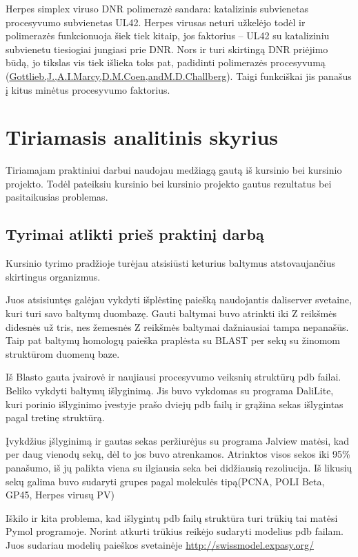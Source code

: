 \documentclass[a4paper,12pt]{article}
\begin{document}
\qquad 
\qquad Herpes simplex viruso DNR polimerazė sandara: katalizinis subvienetas procesyvumo subvienetas UL42. Herpes virusas neturi užkelėjo todėl ir polimerazės funkcionuoja šiek tiek kitaip, jos faktorius – UL42 su kataliziniu subvienetu tiesiogiai jungiasi prie DNR. Nors ir turi skirtingą DNR priėjimo būdą, jo tikslas vis tiek išlieka toks pat, padidinti polimerazės procesyvumą (\hyperlink{Gottlieb}{Gottlieb,J.,A.I.Marcy,D.M.Coen,andM.D.Challberg}). Taigi funkciškai jis panašus į kitus minėtus procesyvumo faktorius.


\clearpage 
\section{Tiriamasis analitinis skyrius}

Tiriamajam praktiniui darbui naudojau medžiagą gautą iš kursinio bei kursinio projekto.
Todėl pateiksiu kursinio bei kursinio projekto gautus rezultatus bei pasitaikusias problemas.


\subsection{Tyrimai atlikti prieš praktinį darbą}
Kursinio tyrimo pradžioje turėjau atsisiūsti keturius baltymus atstovaujančius skirtingus organizmus.

Juos atsisiuntęs galėjau vykdyti išplėstinę paiešką naudojantis daliserver svetaine, kuri turi savo baltymų duombazę. Gauti baltymai buvo atrinkti iki Z reikšmės didesnės už tris, nes žemesnės Z reikšmės baltymai dažniausiai tampa nepanašūs.
Taip pat baltymų homologų paieška praplėsta su BLAST per sekų su žinomom struktūrom duomenų baze.

Iš Blasto gauta įvairovė ir naujiausi procesyvumo veiksnių struktūrų pdb failai. Beliko vykdyti baltymų išlyginimą. Jis buvo vykdomas su programa DaliLite, kuri porinio išlyginimo įvestyje prašo dviejų pdb failų ir grąžina sekas išlygintas pagal tretinę struktūrą.

Įvykdžius įšlyginimą ir gautas sekas peržiurėjus su programa Jalview matėsi, kad per daug vienodų sekų, dėl to jos buvo atrenkamos. Atrinktos visos sekos iki 95\% panašumo, iš jų palikta viena su ilgiausia seka bei didžiausią rezoliucija. Iš likusių sekų galima buvo sudaryti grupes pagal molekulės tipą(PCNA, POLI Beta, GP45, Herpes virusų PV)

Iškilo ir kita problema, kad išlygintų pdb failų struktūra turi trūkių tai matėsi Pymol programoje.
Norint atkurti trūkius reikėjo sudaryti modelius pdb failam. Juos sudariau modelių paieškos svetainėje \hyperlink{swissprot}{http://swissmodel.expasy.org/}
\end{document}
